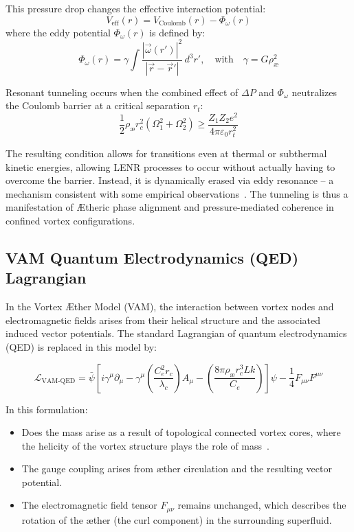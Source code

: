 This pressure drop changes the effective interaction potential:
\begin{equation}
    V_{\text{eff}}(r) = V_{\text{Coulomb}}(r) - \Phi_\omega(r)
\end{equation}
where the eddy potential \( \Phi_\omega(r) \) is defined by:
\begin{equation}
    \Phi_\omega(r) = \gamma \int \frac{|\vec{\omega}(r')|^2}{|\vec{r} - \vec{r}'|} \, d^3r',
    \quad \text{with} \quad
    \gamma = G \rho_{\text{\ae}}^2
\end{equation}

Resonant tunneling occurs when the combined effect of \( \Delta P \) and \( \Phi_\omega \) neutralizes the Coulomb barrier at a critical separation \( r_t \):
\begin{equation}
    \frac{1}{2} \rho_{\text{\ae}} r_c^2 (\Omega_1^2 + \Omega_2^2) \geq \frac{Z_1 Z_2 e^2}{4\pi \varepsilon_0 r_t^2}
\end{equation}

The resulting condition allows for transitions even at thermal or subthermal kinetic energies, allowing LENR processes to occur without actually having to overcome the barrier. Instead, it is dynamically erased via eddy resonance – a mechanism consistent with some empirical observations~\cite{Storms2021}. The tunneling is thus a manifestation of Ætheric phase alignment and pressure-mediated coherence in confined vortex configurations.

\subsection*{VAM Quantum Electrodynamics (QED) Lagrangian}

In the Vortex Æther Model (VAM), the interaction between vortex nodes and electromagnetic fields arises from their helical structure and the associated induced vector potentials. The standard Lagrangian of quantum electrodynamics (QED) is replaced in this model by:

\begin{equation}
    \mathcal{L}_{\text{VAM-QED}} =
    \bar{\psi} \left[ i \gamma^\mu \partial_\mu
                   - \gamma^\mu \left( \frac{C_e^2 r_c}{\lambda_c} \right) A_\mu
                   - \left( \frac{8\pi \rho_{\text{\ae}} r_c^3 Lk}{C_e} \right) \right] \psi
    - \frac{1}{4} F_{\mu\nu} F^{\mu\nu}
\end{equation}

In this formulation:

\begin{itemize}
    \item Does the mass arise as a result of topological connected vortex cores, where the helicity of the vortex structure plays the role of mass~\cite{Volovik2003}.
    \item The gauge coupling arises from æther circulation and the resulting vector potential.
    \item The electromagnetic field tensor \( F_{\mu\nu} \) remains unchanged, which describes the rotation of the æther (the curl component) in the surrounding superfluid.
\end{itemize}


